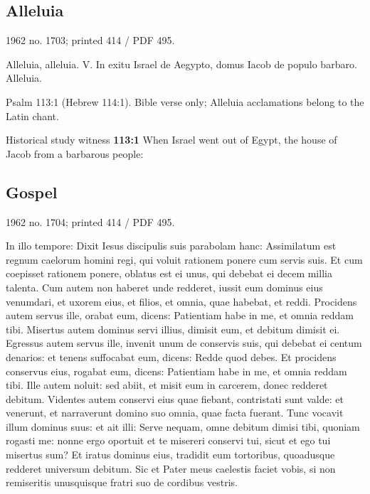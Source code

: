 \subsection{Alleluia}
\label{proper-alleluia}

1962 no. 1703; printed 414 / PDF 495.

\begin{latinproper}
Alleluia, alleluia. V. In exitu Israel de Aegypto, domus Iacob de populo barbaro. Alleluia.
\end{latinproper}

Psalm 113:1 (Hebrew 114:1). Bible verse only; Alleluia acclamations belong to the Latin chant.

\begin{englishwitness}{Historical study witness}
\textbf{113:1} When Israel went out of Egypt, the house of Jacob from a barbarous people:
\end{englishwitness}

\subsection{Gospel}
\label{proper-gospel}

1962 no. 1704; printed 414 / PDF 495.

\begin{latinproper}
In illo tempore: Dixit Iesus discipulis suis parabolam hanc: Assimilatum est regnum caelorum homini regi, qui voluit rationem ponere cum servis suis. Et cum coepisset rationem ponere, oblatus est ei unus, qui debebat ei decem millia talenta. Cum autem non haberet unde redderet, iussit eum dominus eius venumdari, et uxorem eius, et filios, et omnia, quae habebat, et reddi. Procidens autem servus ille, orabat eum, dicens: Patientiam habe in me, et omnia reddam tibi. Misertus autem dominus servi illius, dimisit eum, et debitum dimisit ei. Egressus autem servus ille, invenit unum de conservis suis, qui debebat ei centum denarios: et tenens suffocabat eum, dicens: Redde quod debes. Et procidens conservus eius, rogabat eum, dicens: Patientiam habe in me, et omnia reddam tibi. Ille autem noluit: sed abiit, et misit eum in carcerem, donec redderet debitum. Videntes autem conservi eius quae fiebant, contristati sunt valde: et venerunt, et narraverunt domino suo omnia, quae facta fuerant. Tunc vocavit illum dominus suus: et ait illi: Serve nequam, omne debitum dimisi tibi, quoniam rogasti me: nonne ergo oportuit et te misereri conservi tui, sicut et ego tui misertus sum? Et iratus dominus eius, tradidit eum tortoribus, quoadusque redderet universum debitum. Sic et Pater meus caelestis faciet vobis, si non remiseritis unusquisque fratri suo de cordibus vestris.
\end{latinproper}

